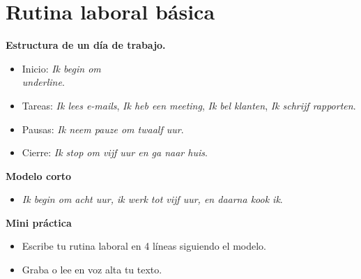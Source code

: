 \section{Rutina laboral básica}
\textbf{Estructura de un día de trabajo.}
\begin{itemize}[leftmargin=*]
  \item Inicio: \textit{Ik begin om \\underline{\hspace{1.2cm}}}.
  \item Tareas: \textit{Ik lees e-mails}, \textit{Ik heb een meeting}, \textit{Ik bel klanten}, \textit{Ik schrijf rapporten}.
  \item Pausas: \textit{Ik neem pauze om twaalf uur}.
  \item Cierre: \textit{Ik stop om vijf uur en ga naar huis}.
\end{itemize}

\textbf{Modelo corto}
\begin{itemize}[leftmargin=*]
  \item \textit{Ik begin om acht uur, ik werk tot vijf uur, en daarna kook ik}.
\end{itemize}

\textbf{Mini práctica}
\begin{itemize}[leftmargin=*]
  \item Escribe tu rutina laboral en 4 líneas siguiendo el modelo.
  \item Graba o lee en voz alta tu texto.
\end{itemize}
